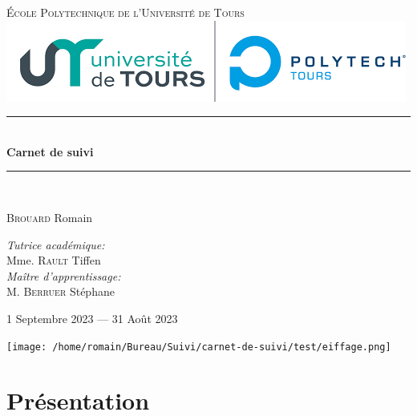 \documentclass[12pt, openany]{report}
\newcommand{\HRule}{\rule{\linewidth}{0.5mm}}
\begin{document}
    \begin{titlepage}
        \begin{center}
            \textsc{\LARGE École Polytechnique de l'Université de Tours}
            \\[2cm]

            \includegraphics{img/polytech}
            \\[2cm]

            \HRule \\[0.4cm]
            { \huge \bfseries Carnet de suivi\\[0.4cm] }

            \HRule \\[2cm]

            \begin{minipage}{0.4\textwidth}
                \begin{flushleft} \large
\textsc{Brouard} Romain\\\end{flushleft}
            \end{minipage}
            \begin{minipage}{0.4\textwidth}
                \begin{flushright} \large
\emph{Tutrice académique:}\\ Mme. \textsc{Rault} Tiffen\\
\emph{Maître d'apprentissage:}\\ M. \textsc{Berruer} Stéphane\\
\end{flushright}
            \end{minipage}

            \vfill

            {\large 1\ier{} Septembre 2023 — 31 Août 2023}

\texttt{[image: /home/romain/Bureau/Suivi/carnet-de-suivi/test/eiffage.png]}


        \end{center}
    \end{titlepage}

    \setcounter{tocdepth}{1}
    \tableofcontents

    \chapter{Présentation}
\end{document}
